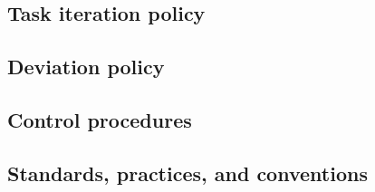 \subsection{Task iteration policy} \label{s:details-of-the-master-test-plan:task-iteration-policy}
	\begin{comment}
		$<$ Describe the criteria used to determine the extent to which a testing task is repeated when its input is changed or task procedure is changed (e.g., reexecuting tests after anomalies have been fixed). These criteria may include assessments of change, integrity level, and effects on budget, schedule, and quality. $>$
	\end{comment}
	
\subsection{Deviation policy} \label{s:details-of-the-master-test-plan:deviation-policy}
	\begin{comment}
		$<$ Describe the procedures and criteria used to deviate from the MTP and level test documentation after they are developed. The information required for deviations includes task identification, rationale, and effect on system/software quality. Identify the authorities responsible for approving deviations. $>$
	\end{comment}
	
\subsection{Control procedures} \label{s:details-of-the-master-test-plan:control-procedures}
	\begin{comment}
		$<$ Identify control procedures applied to the test activities. These procedures describe how the softwarebased system and software products and test results will be configured, protected, and stored.\\
		These procedures may describe quality assurance, configuration management, data management, or other activities if they are not addressed by other efforts. Describe how the test activities comply with existing security provisions and how the test results are to be protected from unauthorized alterations. $>$
	\end{comment}

\subsection{Standards, practices, and conventions} \label{s:details-of-the-master-test-plan:standards-practices-and-conventions}
	\begin{comment}
		$<$ Identify the standards, practices, and conventions that govern the performance of testing tasks including, but not limited to, internal organizational standards, practices, and policies. $>$
	\end{comment}
	
